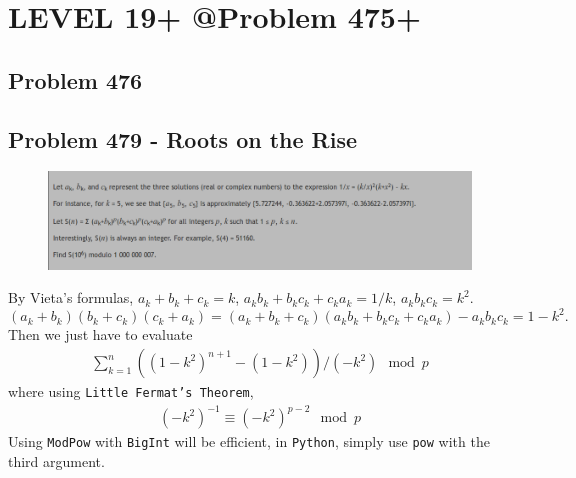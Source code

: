 \chapter{LEVEL 19+ @Problem 475+}
\section{Problem 476}
\begin{prob}
\end{prob}

\section{Problem 479 - Roots on the Rise}
\begin{prob}
	\begin{figure}[htb!]
		\begin{center}
			\includegraphics[scale = 0.4]{pic/479.png}
		\end{center}
	\end{figure}
\end{prob}
\begin{sol}
By Vieta's formulas, $a_k + b_k + c_k = k$, $a_kb_k + b_kc_k + c_ka_k = 1/k$, $a_kb_kc_k = k^2$.
$$
(a_k + b_k)(b_k + c_k)(c_k + a_k) = (a_k + b_k + c_k)(a_kb_k + b_kc_k + c_ka_k) -a_kb_kc_k = 1 - k^2.
$$
Then we just have to evaluate
\begin{eqnarray}
\sum_{k = 1}^n ((1 - k^2)^{n + 1} - (1 - k^2))/(- k^2) \mod p
\end{eqnarray}
where using \texttt{Little Fermat's Theorem},
\begin{eqnarray}
(-k^2)^{-1} \equiv (-k^2)^{p-2} \mod{p}
\end{eqnarray}
Using \texttt{ModPow} with \texttt{BigInt} will be efficient, in \texttt{Python}, simply use \texttt{pow} with the third argument.
\end{sol}
